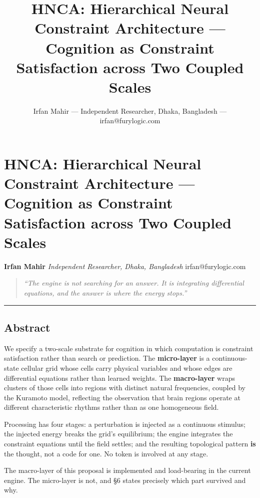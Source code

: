 \documentclass[
  11pt,
  a4paper,
]{article}
\title{HNCA: Hierarchical Neural Constraint Architecture --- Cognition
as Constraint Satisfaction across Two Coupled Scales}
\author{Irfan Mahir --- Independent Researcher, Dhaka, Bangladesh ---
irfan@furylogic.com}
\date{}
\begin{document}
\maketitle

{
\hypersetup{linkcolor=}
\setcounter{tocdepth}{3}
\tableofcontents
}
\section{HNCA: Hierarchical Neural Constraint Architecture --- Cognition
as Constraint Satisfaction across Two Coupled
Scales}\label{hnca-hierarchical-neural-constraint-architecture-cognition-as-constraint-satisfaction-across-two-coupled-scales}

\textbf{Irfan Mahir} \emph{Independent Researcher, Dhaka, Bangladesh}
irfan@furylogic.com

\begin{quote}
\emph{``The engine is not searching for an answer. It is integrating
differential equations, and the answer is where the energy stops.''}
\end{quote}

\begin{center}\rule{0.5\linewidth}{0.5pt}\end{center}

\subsection{Abstract}\label{abstract}

We specify a two-scale substrate for cognition in which computation is
constraint satisfaction rather than search or prediction. The
\textbf{micro-layer} is a continuous-state cellular grid whose cells
carry physical variables and whose edges are differential equations
rather than learned weights. The \textbf{macro-layer} wraps clusters of
those cells into regions with distinct natural frequencies, coupled by
the Kuramoto model, reflecting the observation that brain regions
operate at different characteristic rhythms rather than as one
homogeneous field.

Processing has four stages: a perturbation is injected as a continuous
stimulus; the injected energy breaks the grid's equilibrium; the engine
integrates the constraint equations until the field settles; and the
resulting topological pattern \textbf{is} the thought, not a code for
one. No token is involved at any stage.

The macro-layer of this proposal is implemented and load-bearing in the
current engine. The micro-layer is not, and §6 states precisely which
part survived and why.
\end{document}
